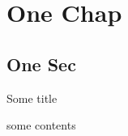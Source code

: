 \documentclass{book}
\begin{document}
\chapter{One Chap}

\section{One Sec}

\begin{bmcsex}{Some title}

some contents

\end{bmcsex}
\end{document}
